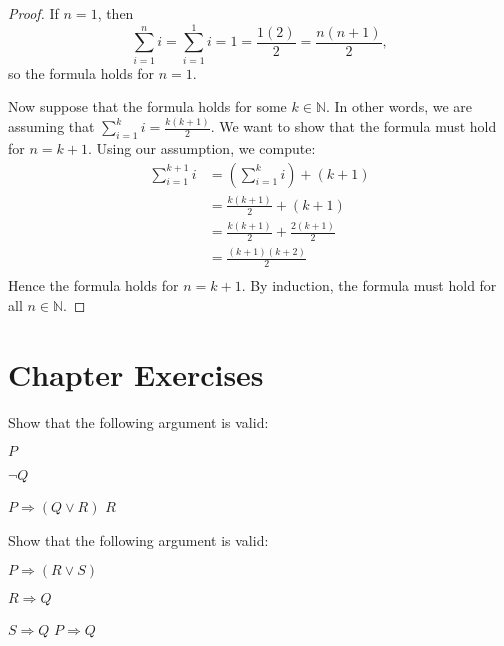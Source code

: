 \begin{proof}
If $n=1$, then \[ \sum_{i=1}^n i=\sum_{i=1}^1 i=1=\frac{1(2)}2=
\frac{n(n+1)}2, \] so the formula holds for $n=1$.

Now suppose that the formula holds for some $k\in\mathbb N$.  In other
words, we are assuming that $\sum_{i=1}^k i=\frac{k(k+1)}2$.  We
want to show that the formula must hold for $n=k+1$.  Using our
assumption, we compute:
\begin{equation*}
\begin{split}
\sum_{i=1}^{k+1} i &= \left(\sum_{i=1}^k i\right) +(k+1)\\
&= \frac{k(k+1)}2+(k+1)\\
&= \frac{k(k+1)}2+\frac{2(k+1)}2\\
&=\frac{(k+1)(k+2)}2\\
\end{split}
\end{equation*}
Hence the formula holds for $n=k+1$.  By induction, the formula must
hold for all $n\in\mathbb N$.
\end{proof}

\clearpage

\section*{Chapter  Exercises}

\begin{exercise}\label{exer:arg}
Show that the following argument is valid:
{\setlength\linwid{1.2in}
\begin{centeredarg}
\item $P$
\item $\neg Q$
\item $P\Rightarrow(Q\lor R)$
\hence $R$
\end{centeredarg}}
\end{exercise}

\begin{exercise}\label{exer:cases}
Show that the following argument is valid:
\begin{centeredarg}
\item $P\Rightarrow(R\lor S)$
\item $R\Rightarrow Q$
\item $S\Rightarrow Q$
\hence $P\Rightarrow Q$
\end{centeredarg}
\end{exercise}

